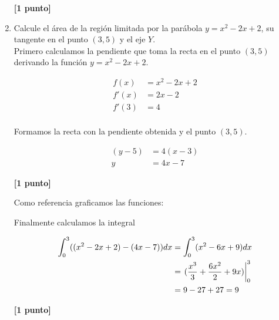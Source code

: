 \documentclass[letterpaper,10pt]{article}
\newcommand{\dis}{\displaystyle}
\begin{document}
\begin{enumerate}
\dotfill\textbf{[1 punto]}



\newpage
\item Calcule el \'{a}rea de la regi\'{o}n limitada por la par\'{a}bola
$y=x^2-2x+2$, su tangente en el punto $(3,5)$ y el eje $Y$.\\


Primero calculamos la pendiente que toma la recta en el punto $(3,5)$ derivando la función $y=x^2-2x+2$.

\begin{align*}
\dis f(x) &= x^2-2x+2\\
\dis f'(x) &= 2x-2\\
\dis f'(3) &= 4\\
\end{align*}

Formamos la recta con la pendiente obtenida y el punto $(3,5)$.

\begin{align*}
\dis (y-5) &= 4(x-3)\\
\dis  y &= 4x-7
\end{align*}

\dotfill\textbf{[1 punto]}

Como referencia graficamos las funciones:

\begin{figure}[!htb]\centering
   \begin{minipage}{0.6\textwidth}
     
   \end{minipage}
   \begin {minipage}{0.3\textwidth}
     
   \end{minipage}
\end{figure}


\newpage
Finalmente calculamos la integral

\begin{align*}
\dis \int_{0}^3 ((x^2-2x+2) - (4x-7))dx &= \int_{0}^3 (x^2-6x+9)dx\\
\dis  &= \displaystyle   \left.(\frac{x^3}{3} + \frac{6x^2}{2} + 9x)\right|_{0}^{3}\\
\dis  &= 9-27+27 = 9
\end{align*}

\dotfill\textbf{[1 punto]}


\end{enumerate}




\vspace{10mm}
\end{document}
